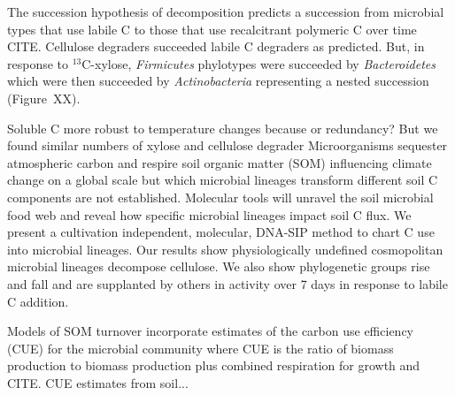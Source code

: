 The succession hypothesis of decomposition predicts a succession from
microbial types that use labile C to those that use recalcitrant polymeric
C over time CITE. Cellulose degraders succeeded labile C degraders as
predicted. But, in response to $^{13}$C-xylose,  \textit{Firmicutes}
phylotypes were succeeded by \textit{Bacteroidetes} which were then
succeeded by \textit{Actinobacteria} representing a nested succession
(Figure~XX). 

Soluble C more robust to temperature changes because or redundancy? But we
found similar numbers of xylose and cellulose degrader
Microorganisms sequester atmospheric carbon and respire soil organic matter
(SOM) influencing climate change on a global scale but which microbial lineages
transform different soil C components are not established. Molecular tools will
unravel the soil microbial food web and reveal how specific microbial lineages
impact soil C flux. We present a cultivation independent, molecular, DNA-SIP
method to chart C use into microbial lineages. Our results show physiologically
undefined cosmopolitan microbial lineages decompose cellulose. We also show
phylogenetic groups rise and fall and are supplanted by others in activity over
7 days in response to labile C addition.  

Models of SOM turnover incorporate estimates of the carbon use efficiency
(CUE) for the microbial community where CUE is the ratio of biomass
production to biomass production plus combined respiration for growth and
 CITE.  CUE estimates from soil... 
